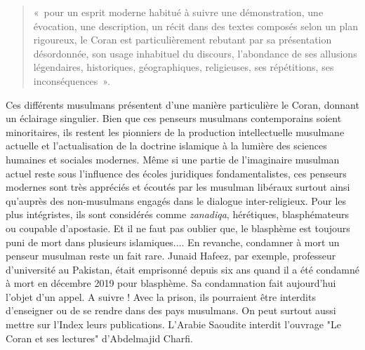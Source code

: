 \begin{quote}
    

«~pour un esprit moderne habitué à suivre une démonstration, une
évocation, une description, un récit dans des textes composés selon un
plan rigoureux, le Coran est particulièrement rebutant par sa
présentation désordonnée, son usage inhabituel du discours, l'abondance
de ses allusions légendaires, historiques, géographiques, religieuses,
ses répétitions, ses inconséquences~».
\end{quote}
Ces différents musulmans présentent d'une manière particulière le Coran,
donnant un éclairage singulier.
Bien que ces penseurs musulmans contemporains soient minoritaires, ils restent les pionniers de la production intellectuelle musulmane actuelle et l'actualisation de la doctrine islamique à la lumière des sciences humaines et sociales modernes. Même si une partie de l'imaginaire musulman actuel reste sous l'influence des écoles juridiques fondamentalistes, ces penseurs modernes sont très appréciés et écoutés par les musulman libéraux surtout ainsi qu'auprès des non-musulmans engagés dans le dialogue inter-religieux.   
Pour les plus intégristes, ils sont considérés comme \textit{zanadiqa}, hérétiques, blasphémateurs ou coupable d'apostasie. Et il ne faut pas oublier que, le blasphème est toujours puni de mort dans plusieurs islamiques.... En revanche, condamner à mort un penseur musulman reste un fait rare. Junaid Hafeez, par exemple, professeur d’université au Pakistan, était emprisonné depuis six ans quand il a été condamné à mort en décembre 2019 pour blasphème. Sa condamnation fait aujourd'hui l'objet d'un appel. A suivre ! Avec la prison, ils pourraient être interdits d'enseigner ou de se rendre dans des pays musulmans. On peut surtout aussi mettre sur l'Index leurs publications. L'Arabie Saoudite interdit l'ouvrage "Le Coran et ses lectures" d'Abdelmajid Charfi. 

